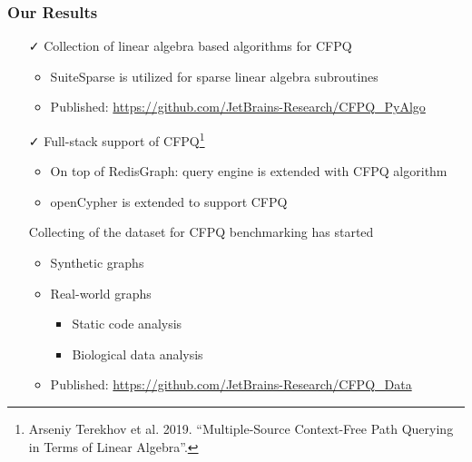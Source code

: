 \documentclass[xcolor=table,aspectratio=169]{beamer}
\begin{document}
\begin{frame}[fragile]
  \frametitle{Our Results}

  \begin{itemize}
    \item[\faCheck] Collection of linear algebra based algorithms for CFPQ
    \begin{itemize}
      \item SuiteSparse is utilized for sparse linear algebra subroutines
      \item Published: \url{https://github.com/JetBrains-Research/CFPQ_PyAlgo}
    \end{itemize}
    \pause
    \item[\faCheck] Full-stack support of CFPQ\footnote{Arseniy Terekhov et al. 2019. ``Multiple-Source Context-Free Path Querying in Terms of Linear Algebra''.}    
    \begin{itemize}
      \item On top of RedisGraph: query engine is extended with CFPQ algorithm
      \item openCypher is extended to support CFPQ
    \end{itemize} 
    \pause 
    \item[\faGears] Collecting of the dataset for CFPQ benchmarking has started
    \begin{itemize}
      \item Synthetic graphs
      \item Real-world graphs
      \begin{itemize}
        \item Static code analysis
        \item Biological data analysis
      \end{itemize}
      \item Published: \url{https://github.com/JetBrains-Research/CFPQ_Data} 
    \end{itemize}     
  \end{itemize}

\end{frame}
\end{document}
